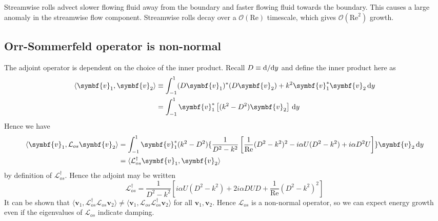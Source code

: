 \documentclass{jknotes}
\newcommand{\ReN}{\text{Re}}
\renewcommand{\L}{\mathcal{L}}
\renewcommand{\v}{\symbf{v}}
\begin{document}
Streamwise rolls advect slower flowing fluid away from the boundary and faster
flowing fluid towards the boundary. This causes a large anomaly in the
streamwise flow component. Streamwise rolls decay over a $\mathcal{O}(\ReN)$
timescale, which gives $\mathcal{O}(\ReN^2)$ growth.

\subsection{Orr-Sommerfeld operator is non-normal}
The adjoint operator is dependent on the choice of the inner product. Recall
$D \equiv \diffd/\diffd y$ and define the inner product here as
\begin{align}
	\langle \v_1, \v_2 \rangle &\equiv \int_{-1}^1 (D\v_1)^*(D\v_2) + k^2
	\v_1^*\v_2 \, \diffd y \\
							   &= \int_{-1}^1 \v_1^*\left[(k^2-D^2)\v_2\right]
							   \, \diffd y
\end{align}
Hence we have
\begin{align}
	\langle \v_1, \L_{os}\v_2\rangle &= \int_{-1}^1 \v_1^*(k^2-D^2)\{
		\frac{1}{D^2 -k^2} \left[ \frac{1}{\ReN} (D^2 -k^2)^2 - i\alpha
	U(D^2-k^2) + i\alpha D^2 U\right]\}\v_2 \,\diffd y \\
									 &= \langle \L_{os}^\dagger \v_1, \v_2
									 \rangle
\end{align}
by definition of $\L_{os}^\dagger$. Hence the adjoint may be written
\begin{equation}
	\L_{os}^\dagger = 	\frac{1}{D^2 -k^2} \left[i\alpha
	U(D^2-k^2) + 2i\alpha DUD+ \frac{1}{\ReN} (D^2 -k^2)^2 \right]
\end{equation}
It can be shown that $\langle \v_1, \L_{os}^\dagger \L_{os} \v_2 \rangle \ne
\langle \v_1, \L_{os}\L_{os}^\dagger \v_2 \rangle$ for all $\v_1, \v_2$. Hence
$\L_{os}$ is a non-normal operator, so we can expect energy growth even if the
eigenvalues of $\L_{os}$ indicate damping.
\end{document}
